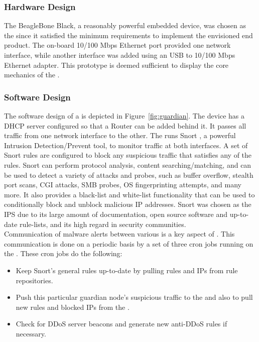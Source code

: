 \subsubsection{Hardware Design}
The BeagleBone Black, a reasonably powerful embedded device, was chosen as the \nodename since it satisfied the minimum requirements to implement the envisioned end product. The on-board 10/100 Mbps Ethernet port provided one network interface, while another interface was added using an USB to 10/100 Mbps Ethernet adapter. This prototype is deemed sufficient to display the core mechanics of the \nodename. 

\subsubsection{Software Design}
\label{sec:design:software}

The software design of a \nodename is depicted in Figure~\ref{fig:guardian}. The device has a DHCP server configured so that a Router can be added behind it. It passes all traffic from one network interface to the other. The \nodename runs Snort \cite{Roesch:1999:SLI:1039834.1039864}, a powerful Intrusion Detection/Prevent tool, to monitor traffic at both interfaces. A set of Snort rules are configured to block any suspicious traffic that satisfies any of the rules. Snort can perform protocol analysis, content searching/matching, and can be used to detect a variety of attacks and probes, such as buffer overflow, stealth port scans, CGI attacks, SMB probes, OS fingerprinting attempts, and many more. It also provides a black-list and white-list functionality that can be used to conditionally block and unblock malicious IP addresses. Snort was chosen as the IPS due to its large amount of documentation, open source software and up-to-date rule-lists, and its high regard in security communities. \\

Communication of malware alerts between various \nodenames is a key aspect of \sysname. This communication is done on a periodic basis by a set of three cron jobs running on the \nodename. These cron jobs do the following:

\begin{itemize}
    \item Keep Snort's general rules up-to-date by pulling rules and IPs from rule repositories.
    \item Push this particular guardian node's suspicious traffic to the \servname and also to pull new rules and blocked IPs from the \servname.
    \item Check for DDoS server beacons and generate new anti-DDoS rules if necessary.
\end{itemize}

